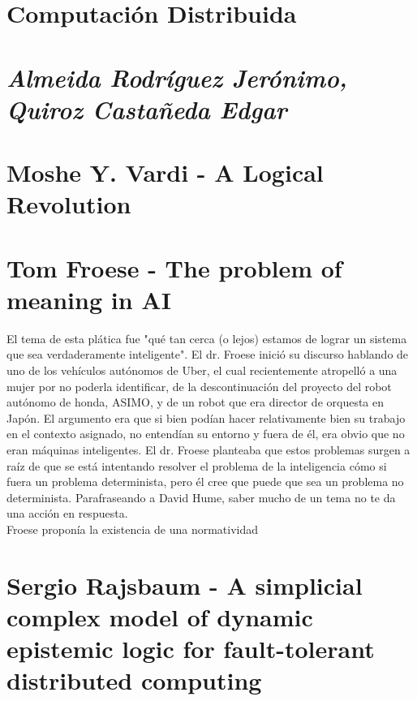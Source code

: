 \documentclass[a4paper,12pt]{article}
\begin{document}
\begin{center}
	\section*{Computación Distribuida}
	\section*{\textit{Almeida Rodríguez Jerónimo, Quiroz Castañeda Edgar}}
\end{center}
\section{Moshe Y. Vardi - A Logical Revolution}


\section{Tom Froese - The problem of meaning in AI}
El tema de esta plática fue "qué tan cerca (o lejos) estamos de lograr un sistema que sea verdaderamente inteligente". El dr. Froese inició su discurso hablando de uno de los vehículos autónomos de Uber, el cual recientemente atropelló a una mujer por no poderla identificar, de la descontinuación del proyecto del robot autónomo de honda, ASIMO, y de un robot que era director de orquesta en Japón. El argumento era que si bien podían hacer relativamente bien su trabajo en el contexto asignado, no entendían su entorno y fuera de él, era obvio que no eran máquinas inteligentes.
El dr. Froese planteaba que estos problemas surgen a raíz de que se está intentando resolver el problema de la inteligencia cómo si fuera un problema determinista, pero él cree que puede que sea un problema no determinista. Parafraseando a David Hume, saber mucho de un tema no te da una acción en respuesta.\\
Froese proponía la existencia de una normatividad

\section{Sergio Rajsbaum - A simplicial complex model of dynamic epistemic logic for fault-tolerant distributed computing}
\end{document}
